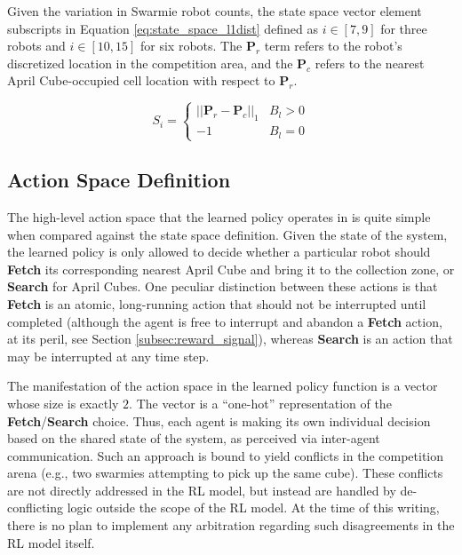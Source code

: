 \documentclass[sigconf,authordraft]{acmart}
\begin{document}
Given the variation in Swarmie robot counts, the state space vector element subscripts in Equation \ref{eq:state_space_l1dist} defined as $i \in [7,9]$ for three robots and $i \in [10,15]$ for six robots. The $\textbf{P}_r$ term refers to the robot's discretized location in the competition area, and the $\textbf{P}_c$ refers to the nearest April Cube-occupied cell location with respect to $\textbf{P}_r$.

\begin{equation}\label{eq:state_space_l1dist}
  S_i =
    \begin{cases}
      ||\textbf{P}_r - \textbf{P}_c||_1 & B_l > 0 \\
      -1 & B_l = 0
    \end{cases}
\end{equation}

\subsection{Action Space Definition}\label{subsec:action_space}
The high-level action space that the learned policy operates in is quite simple when compared against the state space definition. Given the state of the system, the learned policy is only allowed to decide whether a particular robot should \textbf{Fetch} its corresponding nearest April Cube and bring it to the collection zone, or \textbf{Search} for April Cubes. One peculiar distinction between these actions is that \textbf{Fetch} is an atomic, long-running action that should not be interrupted until completed (although the agent is free to interrupt and abandon a \textbf{Fetch} action, at its peril, see Section \ref{subsec:reward_signal}), whereas \textbf{Search} is an action that may be interrupted at any time step. 

The manifestation of the action space in the learned policy function is a vector whose size is exactly $2$. The vector is a ``one-hot'' representation of the \textbf{Fetch}/\textbf{Search} choice. Thus, each agent is making its own individual decision based on the shared state of the system, as perceived via inter-agent communication. Such an approach is bound to yield conflicts in the competition arena (e.g., two swarmies attempting to pick up the same cube). These conflicts are not directly addressed in the RL model, but instead are handled by de-conflicting logic outside the scope of the RL model. At the time of this writing, there is no plan to implement any arbitration regarding such disagreements in the RL model itself.
\end{document}

